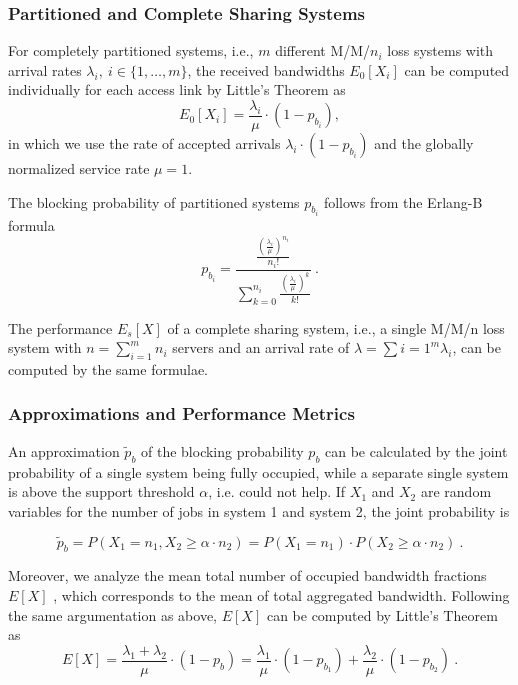 \subsubsection{Partitioned and Complete Sharing Systems}

For completely partitioned systems, i.e., $m$ different M/M/$n_i$ loss systems with arrival rates $\lambda_i,\ i\in\{1,\ldots, m\}$, the received bandwidths $E_0[X_i]$ can be computed individually for each access link by Little's Theorem as
\begin{equation}
E_0[X_i] = \frac{\lambda_i}{\mu}\cdot(1-p_{b_i}),%
\end{equation}
in which we use the rate of accepted arrivals $\lambda_i\cdot(1-p_{b_i})$ and the globally normalized service rate $\mu=1$.

The blocking probability of partitioned systems $p_{b_i}$ follows from the Erlang-B formula \cite{kleinrock1975queuing}
\begin{equation}
p_{b_i} = \frac{\frac{(\frac{\lambda_i}{\mu})^{n_i}}{n_i!}}{\sum_{k=0}^{n_i}\frac{(\frac{\lambda_i}{\mu})^{k}}{k!}}\ .
\end{equation}

The performance $E_s[X]$ of a complete sharing system, i.e., a single M/M/n loss system with $n=\sum_{i=1}^m n_i$ servers and an arrival rate of $\lambda=\sum{i=1}^m \lambda_i$, can be computed by the same formulae.

\subsubsection{Approximations and Performance Metrics}

An approximation $\tilde{p}_b$ of the blocking probability $p_b$ can be calculated by the joint probability of a single system being fully occupied, while a separate single system is above the support threshold $\alpha$, i.e. could not help. If $X_1$ and $X_2$ are random variables for the number of jobs in system 1 and system 2, the joint probability is

\begin{equation}
\tilde{p}_b = P(X_1=n_1,X_2\geq \alpha\cdot n_2) = P(X_1=n_1)\cdot P(X_2\geq \alpha\cdot n_2)\ .
\end{equation}

Moreover, we analyze the mean total number of occupied bandwidth fractions $E[X]$%
, which corresponds to the mean of total aggregated bandwidth. Following the same argumentation as above, $E[X]$ can be computed by Little's Theorem as
\begin{equation}
E[X] = \frac{\lambda_1+\lambda_2}{\mu}\cdot (1-p_b) = \frac{\lambda_1}{\mu}\cdot (1-p_{b_1})+\frac{\lambda_2}{\mu}\cdot(1-p_{b_2})\ .
\end{equation}

